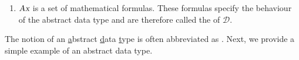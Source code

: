 \begin{enumerate}
      Additionally, we must have either $T_1 = N$ or $S = N$.  Therefore, either
      the first argument of $f$ has to be of type $N$ or the result of $f$ has to be of type 
      $N$, where $N$ is the name of the abstract data type $\mathcal{D}$.  If we have  $T_1 \not= N$ and, therefore,
      $S = N$, then $f$ is called a  of the abstract data type $N$.  
      Otherwise,  $f$ is called a  .
\item $\textsl{Ax}$ is a set of mathematical formulas.   These formulas 
      specify the behaviour of the abstract data type and are therefore called
      the  of $\mathcal{D}$.
\end{enumerate}
The notion of an \underline{a}bstract \underline{d}ata \underline{t}ype is often abbreviated as .
Next, we provide a simple example of an abstract data type.

